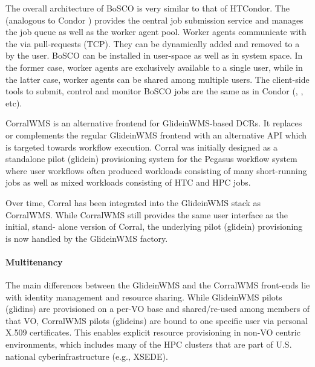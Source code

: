 \documentclass{sig-alternate}
\begin{document}
The overall architecture of BoSCO is very similar to that of HTCondor. The
 (analogous to Condor ) provides the
central job submission service and manages the job queue as well as the worker
agent pool. Worker agents communicate with the  via
pull-requests (TCP). They can be dynamically added and removed to a
 by the user. BoSCO can be installed in user-space
as well as in system space. In the former case, worker agents are exclusively
available to a single user, while in the latter case, worker agents can be
shared among multiple users. The client-side tools to submit, control and
monitor BoSCO jobs are the same as in Condor (,
, etc).

CorralWMS is an alternative frontend for GlideinWMS-based DCRs. It
replaces or complements the regular GlideinWMS frontend with an alternative
API which is targeted towards workflow execution. Corral was initially designed
as a standalone pilot (glidein) provisioning system for the Pegasus workflow
system where user workflows often produced workloads consisting of many
short-running jobs as well as mixed workloads consisting of HTC and HPC jobs.

Over time, Corral has been integrated into the GlideinWMS stack as CorralWMS.
While CorralWMS still provides the same user interface as the initial, stand-
alone version of Corral, the underlying pilot (glidein) provisioning is now
handled by the GlideinWMS factory.


\paragraph{Multitenancy}

The main differences between the GlideinWMS and the CorralWMS front-ends lie
with identity management and resource sharing. While GlideinWMS pilots
(glidins) are provisioned on a per-VO base and shared/re-used among members of
that VO, CorralWMS pilots (glideins) are bound to one specific user via
personal X.509 certificates. This enables explicit resource provisioning in
non-VO centric environments, which includes many of the HPC clusters that are
part of U.S. national cyberinfrastructure (e.g., XSEDE).
\end{document}

